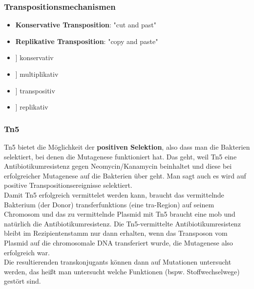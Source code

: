 \subsubsection{Transpositionsmechanismen} 
\begin{itemize}
    \item \textbf{Konservative Transposition}: "cut and past"
    \item \textbf{Replikative Transposition}: "copy and paste" 
\end{itemize}
\begin{mechanism}[title=Was ist der Tanspositionsmechanismus von Tn5?]
\todo
\begin{itemize}
    \item[[ ]] konservativ
    \item[[ ]] multiplikativ
    \item[[ ]] transpositiv
    \item[[ ]] replikativ
\end{itemize}
\end{mechanism}

\subsubsection{Tn5}
Tn5 bietet die Möglichkeit der \textbf{positiven Selektion}, also dass man die Bakterien selektiert, bei denen die Mutagenese funktioniert hat. Das geht, weil Tn5 eine Antibiotikumresistenz gegen Neomycin/Kanamycin beinhaltet und diese bei erfolgreicher Mutagenese auf die Bakterien über geht. Man sagt auch es wird auf positive Transpositionsereignisse selektiert. \\ \newline
Damit Tn5 erfolgreich vermittelet werden kann, braucht das vermittelnde Bakterium (der Donor) \glspl{transferfunktion} (eine tra-Region) auf seinem Chromosom und das zu vermittelnde Plasmid mit Tn5 braucht eine \gls{mob} und natürlich die Antibiotikumresistenz.  Die Tn5-vermittelte Antibiotikumresistenz bleibt im Rezipientenstamm nur dann erhalten, wenn das Transposon vom Plasmid auf die chromosomale DNA transferiert wurde, die Mutagenese also erfolgreich war. \\ \newline
Die resultierenden \glspl{transkonjugant} können dann auf Mutationen untersucht werden, das heißt man untersucht welche Funktionen (bspw. Stoffwechselwege) gestört sind. 

